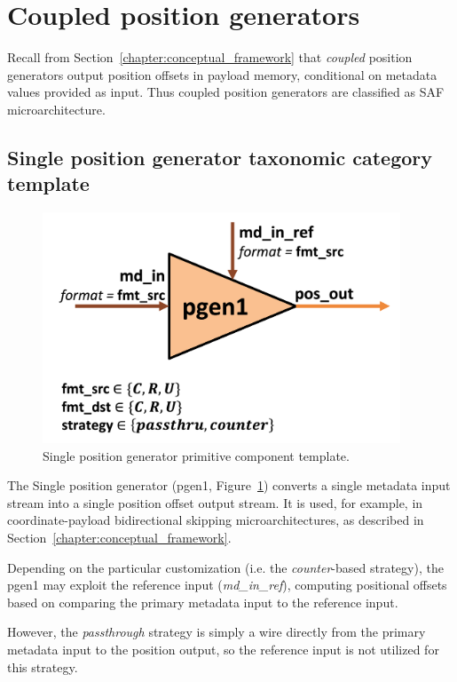 \section{Coupled position generators}

Recall from Section~\ref{chapter:conceptual_framework} that \textit{coupled} position generators output position offsets in payload memory, conditional on metadata values provided as input. Thus coupled position generators are classified as SAF microarchitecture.

\subsection{Single position generator taxonomic category template}

\begin{figure}[H]
    \centering
    \includegraphics[width=0.95\textwidth]{figures/pgen1.png}
    \caption{Single position generator primitive component template.}
    \label{fig:pgen1}
\end{figure}

The Single position generator (pgen1, Figure~\ref{fig:pgen1}) converts a single metadata input stream into a single position offset output stream. It is used, for example, in coordinate-payload bidirectional skipping microarchitectures, as described in Section~\ref{chapter:conceptual_framework}.

Depending on the particular customization (i.e. the \textit{counter}-based strategy), the pgen1 may exploit the reference input (\textit{md\_in\_ref}), computing positional offsets based on comparing the primary metadata input to the reference input.

However, the \textit{passthrough} strategy is simply a wire directly from the primary metadata input to the position output, so the reference input is not utilized for this strategy.

